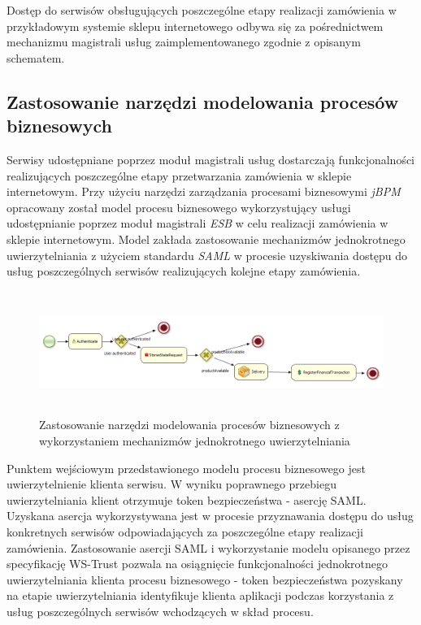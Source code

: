 	Dostęp do serwisów obsługujących poszczególne etapy realizacji zamówienia w przykładowym systemie sklepu internetowego odbywa się za pośrednictwem mechanizmu magistrali usług zaimplementowanego zgodnie z opisanym schematem. 
	
	\subsection{Zastosowanie narzędzi modelowania procesów biznesowych}

	Serwisy udostępniane poprzez moduł magistrali usług dostarczają funkcjonalności realizujących poszczególne etapy przetwarzania zamówienia w sklepie internetowym. Przy użyciu narzędzi zarządzania procesami biznesowymi \textit{jBPM} opracowany został model procesu biznesowego wykorzystujący usługi udostępnianie poprzez moduł magistrali \textit{ESB} w celu realizacji zamówienia w sklepie internetowym. Model zakłada zastosowanie mechanizmów jednokrotnego uwierzytelniania z użyciem standardu \textit{SAML} w procesie uzyskiwania dostępu do usług poszczególnych serwisów realizujących kolejne etapy zamówienia. 

		\begin{figure}[h]
			\centering
			\includegraphics[width=18cm,height=4cm]{img/jbpm_order_process.png}
			\caption{Zastosowanie narzędzi modelowania procesów biznesowych z wykorzystaniem mechanizmów jednokrotnego uwierzytelniania}
			\label{jBPM process}
		\end{figure}

	Punktem wejściowym przedstawionego modelu procesu biznesowego jest uwierzytelnienie klienta serwisu. W wyniku poprawnego przebiegu uwierzytelniania klient otrzymuje token bezpieczeństwa - asercję SAML. Uzyskana asercja wykorzystywana jest w procesie przyznawania dostępu do usług konkretnych serwisów odpowiadających za poszczególne etapy realizacji zamówienia. Zastosowanie asercji SAML i wykorzystanie modelu opisanego przez specyfikację WS-Trust pozwala na osiągnięcie funkcjonalności jednokrotnego uwierzytelniania klienta procesu biznesowego - token bezpieczeństwa pozyskany na etapie uwierzytelniania identyfikuje klienta aplikacji podczas korzystania z usług poszczególnych serwisów wchodzących w skład procesu.
